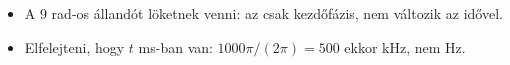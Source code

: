 \begin{eredmeny}

\begin{center}\end{center}
\end{eredmeny}
\begin{figyelem}
\begin{itemize}
\item A 9 rad-os állandót löketnek venni: az csak kezdőfázis, nem változik az idővel.
\item Elfelejteni, hogy $t$ ms-ban van: $1000\pi/(2\pi)=500$ ekkor kHz, nem Hz.
\end{itemize}
\end{figyelem}


